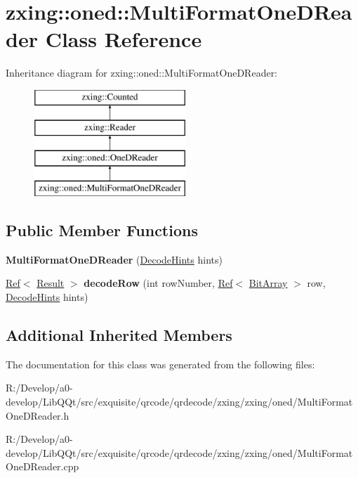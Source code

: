 \hypertarget{classzxing_1_1oned_1_1_multi_format_one_d_reader}{}\section{zxing\+:\+:oned\+:\+:Multi\+Format\+One\+D\+Reader Class Reference}
\label{classzxing_1_1oned_1_1_multi_format_one_d_reader}
Inheritance diagram for zxing\+:\+:oned\+:\+:Multi\+Format\+One\+D\+Reader\+:\begin{figure}[H]
\begin{center}
\leavevmode
\includegraphics[height=4.000000cm]{classzxing_1_1oned_1_1_multi_format_one_d_reader}
\end{center}
\end{figure}
\subsection*{Public Member Functions}
\begin{DoxyCompactItemize}
\item 
\mbox{\label{classzxing_1_1oned_1_1_multi_format_one_d_reader_a2e376450c05f1e458be73a3f2b5f9b1e}} 
{\bfseries Multi\+Format\+One\+D\+Reader} (\mbox{\hyperlink{classzxing_1_1_decode_hints}{Decode\+Hints}} hints)
\item 
\mbox{\label{classzxing_1_1oned_1_1_multi_format_one_d_reader_ac228a227f779a8909e000a161ee43b58}} 
\mbox{\hyperlink{classzxing_1_1_ref}{Ref}}$<$ \mbox{\hyperlink{classzxing_1_1_result}{Result}} $>$ {\bfseries decode\+Row} (int row\+Number, \mbox{\hyperlink{classzxing_1_1_ref}{Ref}}$<$ \mbox{\hyperlink{classzxing_1_1_bit_array}{Bit\+Array}} $>$ row, \mbox{\hyperlink{classzxing_1_1_decode_hints}{Decode\+Hints}} hints)
\end{DoxyCompactItemize}
\subsection*{Additional Inherited Members}


The documentation for this class was generated from the following files\+:\begin{DoxyCompactItemize}
\item 
R\+:/\+Develop/a0-\/develop/\+Lib\+Q\+Qt/src/exquisite/qrcode/qrdecode/zxing/zxing/oned/Multi\+Format\+One\+D\+Reader.\+h\item 
R\+:/\+Develop/a0-\/develop/\+Lib\+Q\+Qt/src/exquisite/qrcode/qrdecode/zxing/zxing/oned/Multi\+Format\+One\+D\+Reader.\+cpp\end{DoxyCompactItemize}
